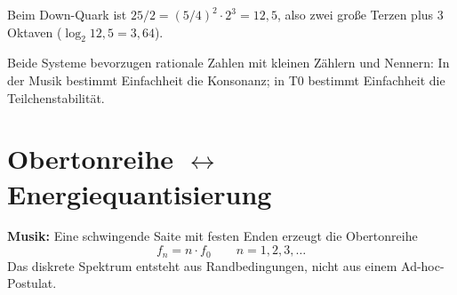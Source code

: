 \begin{table}[h]
\centering
{}
\caption{Yukawa-Koeffizienten und ihre musikalische Interpretation. Der Tau-Koeffizient $25/9 = (5/3)^2$ ist das Quadrat der großen Sexte; seine oktavreduzierte Form $25/18$ unterscheidet sich vom klassischen Tritonus $45/32$ um exakt ein syntonisches Komma $81/80$.}
\label{tab:yukawa-musik}
\end{table}
\noindent Beim Down-Quark ist $25/2 = (5/4)^2 \cdot 2^3 = 12{,}5$, also zwei große Terzen plus 3 Oktaven ($\log_2 12{,}5 = 3{,}64$).

Beide Systeme bevorzugen rationale Zahlen mit kleinen Zählern und Nennern: In der Musik bestimmt Einfachheit die Konsonanz; in T0 bestimmt Einfachheit die Teilchenstabilität.

\section{\texorpdfstring{Obertonreihe $\leftrightarrow$ Energiequantisierung}{Obertonreihe -- Energiequantisierung}}

\textbf{Musik:} Eine schwingende Saite mit festen Enden erzeugt die Obertonreihe
\begin{equation}
	f_n = n \cdot f_0 \qquad n = 1, 2, 3, \ldots
\end{equation}
Das diskrete Spektrum entsteht aus Randbedingungen, nicht aus einem Ad-hoc-Postulat.

